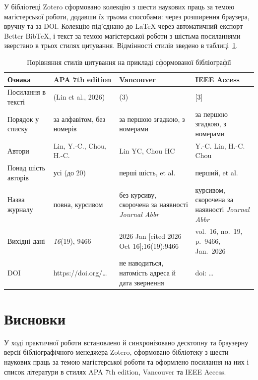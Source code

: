 \documentclass[14pt,a4paper]{extreport}
\begin{document}
У бібліотеці Zotero сформовано колекцію з шести наукових праць за темою магістерської роботи, додавши їх трьома способами: через розширення браузера, вручну та за DOI. Колекцію під'єднано до LaTeX через автоматичний експорт Better BibTeX, і текст за темою магістерської роботи з шістьма посиланнями зверстано в трьох стилях цитування. Відмінності стилів зведено в таблиці~\ref{tab:styles}.

\begin{table}[H]
\caption{Порівняння стилів цитування на прикладі сформованої бібліографії}
\label{tab:styles}
\small
\begin{tabularx}{\linewidth}{|l|X|X|X|}
\hline
\textbf{Ознака} & \textbf{APA 7th edition} & \textbf{Vancouver} & \textbf{IEEE Access} \\
\hline
Посилання в тексті & (Lin et al., 2026) & (3) & [3] \\
\hline
Порядок у списку & за алфавітом, без номерів & за першою згадкою, з номерами & за першою згадкою, з номерами \\
\hline
Автори & Lin, Y.-C., Chou, H.-C. & Lin YC, Chou HC & Y.-C. Lin, H.-C. Chou \\
\hline
Понад шість авторів & усі (до 20) & перші шість, et al. & перший, et al. \\
\hline
Назва журналу & повна, курсивом & без курсиву, скорочена за наявності \textit{Journal Abbr} & курсивом, скорочена за наявності \textit{Journal Abbr} \\
\hline
Вихідні дані & \textit{16}(19), 9466 & 2026 Jan [cited 2026 Oct 16];16(19):9466 & vol.~16, no.~19, p.~9466, Jan.~2026 \\
\hline
DOI & https://doi.org/\ldots & не наводиться, натомість адреса й дата звернення & doi: \ldots \\
\hline
\end{tabularx}
\end{table}

\section{Висновки}

У ході практичної роботи встановлено й синхронізовано десктопну та браузерну версії бібліографічного менеджера Zotero, сформовано бібліотеку з шести наукових праць за темою магістерської роботи та оформлено посилання на них і список літератури в стилях APA 7th edition, Vancouver та IEEE Access.
\end{document}
